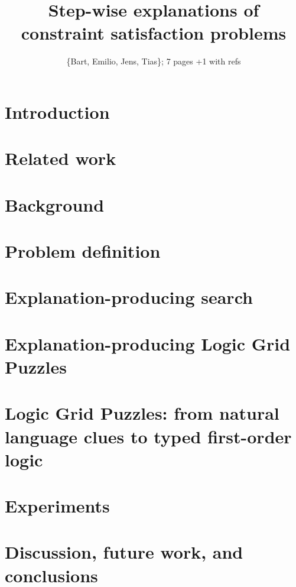 \documentclass{ecai}
\begin{document}
\title{Step-wise explanations of constraint satisfaction problems}

\author{\{Bart, Emilio, Jens, Tias\}; 7 pages +1 with refs}

\maketitle


\begin{abstract}

\end{abstract}


\section{Introduction}


\section{Related work}


\section{Background}


\section{Problem definition}



\section{Explanation-producing search}\label{sec:expl-gen-prod}



\section{Explanation-producing Logic Grid Puzzles}



\section{Logic Grid Puzzles: from natural language clues to typed first-order logic}\label{sec:holistic}



\section{Experiments}


\section{Discussion, future work, and conclusions}



\end{document}
